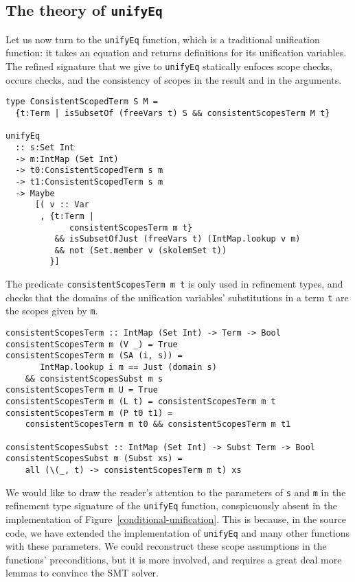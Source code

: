 \documentclass[sigconf]{acmart}
\newcommand{\tc}[1]{{\small\texttt{#1}}}
\begin{document}
\subsection{The theory of \tc{unifyEq}}
\label{checking-unifyEq}

Let us now turn to the \tc{unifyEq} function, which is a traditional unification
function: it takes an equation and returns definitions for its unification
variables.
The refined signature that we give to \tc{unifyEq} statically enfoces scope checks, occurs checks,
and the consistency of scopes in the result and in the arguments.

\begin{verbatim}
type ConsistentScopedTerm S M =
  {t:Term | isSubsetOf (freeVars t) S && consistentScopesTerm M t}

unifyEq
  :: s:Set Int
  -> m:IntMap (Set Int)
  -> t0:ConsistentScopedTerm s m
  -> t1:ConsistentScopedTerm s m
  -> Maybe
      [( v :: Var
       , {t:Term |
             consistentScopesTerm m t}
          && isSubsetOfJust (freeVars t) (IntMap.lookup v m)
          && not (Set.member v (skolemSet t))
         }]
\end{verbatim}

The predicate \tc{consistentScopesTerm m t} is only used in refinement types, and
checks that the domains of the unification variables' substitutions in a term
\tc{t} are the scopes given by \tc{m}.

\begin{verbatim}
consistentScopesTerm :: IntMap (Set Int) -> Term -> Bool
consistentScopesTerm m (V _) = True
consistentScopesTerm m (SA (i, s)) =
       IntMap.lookup i m == Just (domain s)
    && consistentScopesSubst m s
consistentScopesTerm m U = True
consistentScopesTerm m (L t) = consistentScopesTerm m t
consistentScopesTerm m (P t0 t1) =
    consistentScopesTerm m t0 && consistentScopesTerm m t1

consistentScopesSubst :: IntMap (Set Int) -> Subst Term -> Bool
consistentScopesSubst m (Subst xs) =
    all (\(_, t) -> consistentScopesTerm m t) xs
\end{verbatim}

We would like to draw the reader's attention to the parameters of \tc{s}
and \tc{m} in the refinement type signature of the \tc{unifyEq} function,
conspicuously absent in the implementation of
Figure~\ref{conditional-unification}. This is because, in the source code,
we have extended the implementation of \tc{unifyEq} and many other functions
with these parameters. We could reconstruct these scope assumptions in the
functions' preconditions, but it is more involved, and requires a great deal more
lemmas to convince the SMT solver.
\end{document}
